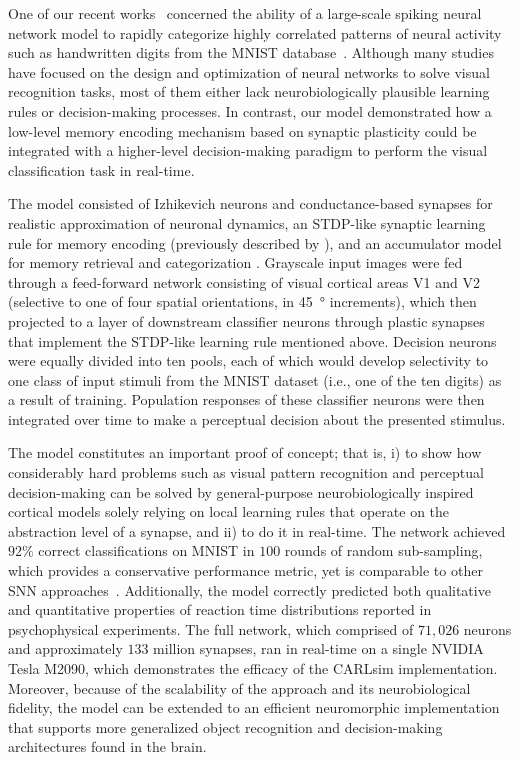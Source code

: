 One of our recent works~\citep{Beyeler2013} concerned the ability of
a large-scale spiking neural network model to rapidly
categorize highly correlated patterns of neural activity such as
handwritten digits from the MNIST database~\citep{LeCun1998}. Although
many studies have focused on the design and optimization of
neural networks to solve visual recognition tasks, most of
them either lack neurobiologically plausible learning rules or
decision-making processes. In contrast, our model
demonstrated how a low-level memory encoding mechanism
based on synaptic plasticity could be integrated with a
higher-level decision-making paradigm to perform the visual
classification task in real-time.

The model consisted of Izhikevich neurons and
conductance-based synapses for realistic approximation of
neuronal dynamics, an \ac{STDP}-like synaptic learning rule for
memory encoding (previously described by \citet{Brader2007}), and an
accumulator model for memory retrieval and categorization 
\citep{SmithRatcliff2004}.
Grayscale input images were fed through a feed-forward
network consisting of visual cortical areas V1 and V2
(selective to one of four spatial orientations, in \SI{45}{\degree}
increments), which then projected to a layer of downstream
classifier neurons through plastic synapses that implement the
\ac{STDP}-like learning rule mentioned above. Decision neurons
were equally divided into ten pools, each of which would
develop selectivity to one class of input stimuli from the
MNIST dataset (i.e., one of the ten digits) as a result of
training. Population responses of these classifier neurons were
then integrated over time to make a perceptual decision about
the presented stimulus.

The model constitutes an important proof of concept; that is,
i) to show how considerably hard problems such as visual
pattern recognition and perceptual decision-making can be
solved by general-purpose neurobiologically inspired cortical
models solely relying on local learning rules that operate on
the abstraction level of a synapse, and ii) to do it in real-time.
The network achieved $92\%$ correct classifications on MNIST
in $100$ rounds of random sub-sampling, which provides a
conservative performance metric, yet is comparable to other
\ac{SNN} approaches~\citep{Brader2007,Querlioz2011}.
Additionally, the model
correctly predicted both qualitative and quantitative properties
of reaction time distributions reported in psychophysical
experiments. The full network, which comprised of $71,026$
neurons and approximately $133$ million synapses, ran in
real-time on a single NVIDIA Tesla M2090, which
demonstrates the efficacy of the CARLsim implementation.
Moreover, because of the scalability of the approach and its
neurobiological fidelity, the model can be extended to an
efficient neuromorphic implementation that supports more
generalized object recognition and decision-making
architectures found in the brain.




